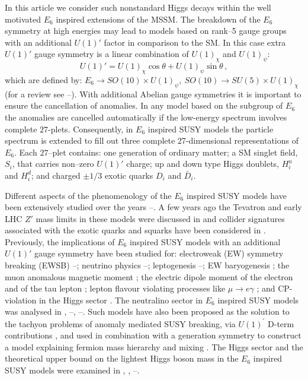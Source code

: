 \documentclass[12pt,a4paper]{article}
\newcommand{\be}{\begin{equation}}
\newcommand{\ee}{\end{equation}}
\begin{document}
In this article we consider such nonstandard Higgs decays within the
well motivated $E_6$ inspired extensions of the MSSM. The breakdown of
the $E_6$ symmetry at high energies may lead to models based on
rank--5 gauge groups with an additional $U(1)'$ factor in comparison to
the SM. In this case extra $U(1)'$ gauge symmetry is a linear
combination of $U(1)_{\chi}$ and $U(1)_{\psi}$: \be
U(1)'=U(1)_{\chi}\cos\theta+U(1)_{\psi}\sin\theta\,,
\label{hd4}
\ee
which are defined by: $E_6\to SO(10)\times U(1)_{\psi},~SO(10)\to SU(5)\times U(1)_{\chi}$
(for a review see \cite{Langacker:2008yv}--\cite{E6-review}).  With additional Abelian gauge
symmetries it is important to ensure the cancellation of anomalies. In any model based on the
subgroup of $E_6$ the anomalies are cancelled automatically if the low-energy spectrum involves
complete $27$-plets. Consequently, in $E_6$ inspired SUSY models the particle spectrum is
extended to fill out three complete 27-dimensional representations of $E_6$. Each $27$--plet
contains: one generation of ordinary matter; a SM singlet field, $S_i$, that carries non--zero $U(1)'$
charge; up and down type Higgs doublets, $H^{u}_{i}$ and $H^{d}_{i}$; and charged
$\pm 1/3$ exotic quarks $D_i$ and $\bar{D}_i$.

Different aspects of the phenomenology of the $E_6$ inspired SUSY models have been
extensively studied over the years \cite{E6-review}--\cite{E6}. A few years ago the Tevatron
and early LHC $Z'$ mass limits in these models were discussed in \cite{Accomando:2010fz}
and collider signatures associated with the exotic quarks and squarks have been considered
in \cite{Kang:2007ib}. Previously, the implications of $E_6$ inspired SUSY models with an
additional $U(1)'$ gauge symmetry have been studied for: electroweak (EW) symmetry breaking
(EWSB) \cite{Langacker:1998tc}--\cite{Daikoku:2000ep}; neutrino physics \cite{Kang:2004ix}--\cite{Ma:1995xk};
leptogenesis \cite{Hambye:2000bn}--\cite{King:2008qb};
EW baryogenesis \cite{baryogen}; the muon anomalous magnetic moment \cite{g-2}; the electric
dipole moment of the electron \cite{Suematsu:1997tv} and of the tau lepton \cite{GutierrezRodriguez:2006hb};
lepton flavour violating processes like $\mu\to e\gamma$ \cite{Suematsu:1997qt}; and CP-violation in the
Higgs sector \cite{Ham:2008fx}. The neutralino sector in $E_6$ inspired SUSY models was analysed
in \cite{Keith:1997zb}, \cite{Suematsu:1997tv}--\cite{Suematsu:1997qt},
\cite{Suematsu:1997au}--\cite{E6neutralino-higgs}.  Such models have also been proposed as
the solution to the tachyon problems of anomaly mediated SUSY breaking, via $U(1)^\prime$ D-term
contributions \cite{Asano:2008ju}, and used in combination with a generation symmetry to construct
a model explaining fermion mass hierarchy and mixing \cite{Stech:2008wd}. The Higgs sector and
the theoretical upper bound on the lightest Higgs boson mass in the $E_6$ inspired SUSY models
were examined in \cite{Daikoku:2000ep}, \cite{E6neutralino-higgs}, \cite{King:2005jy}--\cite{E6-higgs}.
\end{document}
